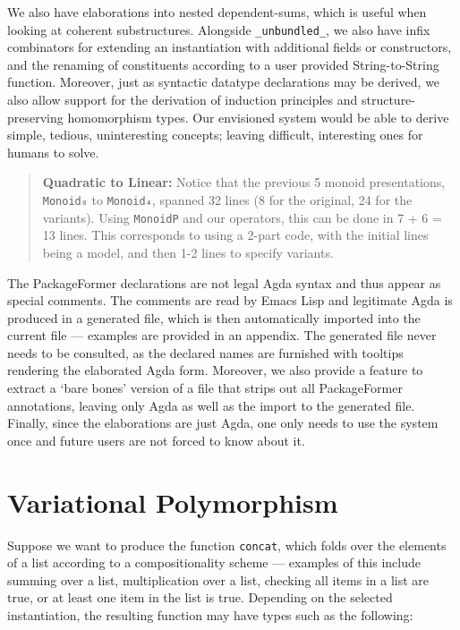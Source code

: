 \documentclass[sigplan,screen]{acmart}
\begin{document}
We also have elaborations into nested dependent-sums, which is useful
when looking at coherent substructures.
Alongside \texttt{\_unbundled\_}, we also have infix combinators for extending an
instantiation with additional fields or constructors, and the renaming of constituents
according to a user provided String-to-String function.
Moreover, just as syntactic datatype declarations may be derived, we also
allow support for the derivation of induction principles and structure-preserving homomorphism types.
Our envisioned system would be able to derive simple, tedious, uninteresting concepts; leaving difficult,
interesting ones for humans to solve.

\begin{quote}
\textbf{Quadratic to Linear:}
Notice that the previous 5 monoid presentations, \texttt{Monoid₀} to \texttt{Monoid₄}, spanned 32
lines (8 for the original, 24 for the variants). Using \texttt{MonoidP} and our operators,
this can be done in 7 + 6 = 13 lines.  This corresponds to using a 2-part code,
with the initial lines being a model, and then 1-2 lines to specify variants.
\end{quote}

The PackageFormer declarations are not legal Agda syntax and thus appear as special comments.
The comments are read by Emacs Lisp and legitimate Agda is produced in a generated file, which is
then automatically imported into the current file --- examples are provided in an appendix.
The generated file never needs to be consulted,
as the declared names are furnished with tooltips rendering the elaborated
Agda form. Moreover, we also provide a feature to extract a ‘bare bones’ version
of a file that strips out all PackageFormer annotations, leaving only Agda
as well as the import to the generated file. Finally, since the elaborations are
just Agda, one only needs to use the system once and future users are
not forced to know about it.

\section{\textsf{\upshape Variational} Polymorphism}
\label{sec:org18a34d1}
Suppose we want to produce the function \texttt{concat}, which folds over the elements of a list
according to a compositionality scheme --- examples of this include summing over
a list, multiplication over a list, checking all items in a list are true, or
at least one item in the list is true.
Depending on the selected instantiation,
the resulting function may have types such as the following:
\end{document}
